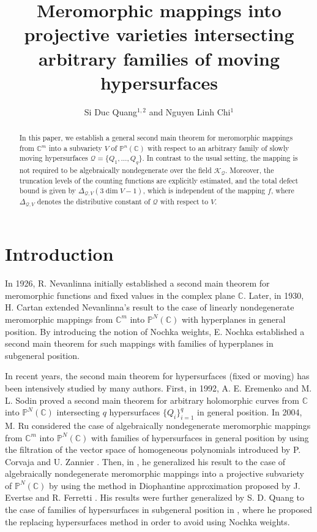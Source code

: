 \documentclass[12pt,leqno]{amsart}
\title[Meromorphic mappings into projective varieties]{Meromorphic mappings into projective varieties intersecting arbitrary families of moving hypersurfaces}
\author{Si Duc Quang$^{1,2}$ and Nguyen Linh Chi$^{1}$}
\newcommand{\C}{{\mathbb{C}}}
\renewcommand{\P}{{\mathbb{P}}}
\numberwithin{equation}{section}
\begin{document}
\begin{abstract}
In this paper, we establish a general second main theorem for meromorphic mappings from $\C^m$ into a subvariety $V$ of $\P^n(\C)$ with respect to an arbitrary family of slowly moving hypersurfaces $\mathcal Q=\{Q_1,\ldots,Q_q\}$. In contrast to the usual setting, the mapping is not required to be algebraically nondegenerate over the field $\mathcal K_{\mathcal Q}$. Moreover, the truncation levels of the counting functions are explicitly estimated, and the total defect bound is given by $\Delta_{\mathcal Q,V}(3\dim V-1)$, which is independent of the mapping $f$, where $\Delta_{\mathcal Q,V}$ denotes the distributive constant of $\mathcal Q$ with respect to $V$.
\end{abstract}

\def\thefootnote{\empty}

\maketitle

\section{Introduction}

In 1926, R. Nevanlinna \cite{N} initially established a second main theorem for meromorphic functions and fixed values in the complex plane $\C$. Later, in 1930, H. Cartan \cite{Ca} extended Nevanlinna's result to the case of linearly nondegenerate meromorphic mappings from $\C^m$ into $\P^N(\C)$ with hyperplanes in general position. By introducing the notion of Nochka weights, E. Nochka \cite{Noc83} established a second main theorem for such mappings with families of hyperplanes in subgeneral position.

In recent years, the second main theorem for hypersurfaces (fixed or moving) has been intensively studied by many authors. First, in 1992, A. E. Eremenko and M. L. Sodin \cite{ES} proved a second main theorem for arbitrary holomorphic curves from $\C$ into $\P^N(\C)$ intersecting $q$ hypersurfaces $\{Q_i\}_{i=1}^q$ in general position. In 2004, M. Ru \cite{Ru04} considered the case of algebraically nondegenerate meromorphic mappings from $\C^m$ into $\P^N(\C)$ with families of hypersurfaces in general position by using the filtration of the vector space of homogeneous polynomials introduced by P. Corvaja and U. Zannier \cite{CZ}. Then, in \cite{Ru09}, he generalized his result to the case of algebraically nondegenerate meromorphic mappings into a projective subvariety of $\P^N(\C)$ by using the method in Diophantine approximation proposed by J. Evertse and R. Ferretti \cite{EF1}. His results were further generalized by S. D. Quang to the case of families of hypersurfaces in subgeneral position in \cite{Q19}, where he proposed the replacing hypersurfaces method in order to avoid using Nochka weights.
\end{document}
